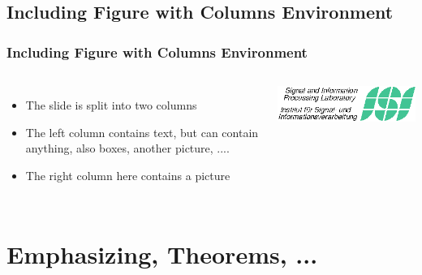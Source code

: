 \documentclass{beamer}
\newcommand{\subsectitle}{}
\newcommand{\subsectiontitle}[1]{\renewcommand{\subsectitle}{#1}}
\begin{document}
   \subsectiontitle{Including Figure with Columns Environment}
   \subsection{\subsectitle}
       \begin{frame}
         \frametitle{\subsectitle}

           \begin{columns}[c] 
                 \begin{itemize}
                    \item The slide is split into two columns
                    \item The left column contains text, but can
                    contain anything, also boxes, another picture, ....
                    \item The right column here contains a picture
                 \end{itemize}        


               \includegraphics[width=\columnwidth]{isilogo_left.eps}
           \end{columns}
      \end{frame}     
       

\section{Emphasizing, Theorems, ...}



 \subsectiontitle{Emphasizing Important Subjects with Blocks}
 
\end{document}
